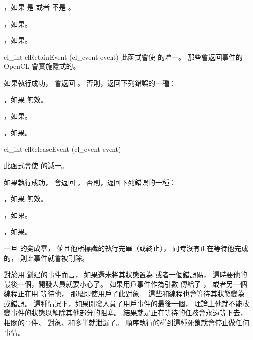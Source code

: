 \item {}，如果  是 
或者  不是 。

\item {}，如果\scdevfailres。

\item {}，如果\schostfailres。
\stopigBase


\startCLFUNC
cl_int clRetainEvent (cl_event event)
\stopCLFUNC
此函式會使  的增一。
那些會返回事件的 OpenCL 會實施隱式的。

如果執行成功，  會返回 。
否則，返回下列錯誤的一種：
\startigBase
\item {}，如果  無效。

\item {}，如果\scdevfailres。

\item {}，如果\schostfailres。
\stopigBase


\startCLFUNC
cl_int clReleaseEvent (cl_event event)
\stopCLFUNC

此函式會使  的減一。

如果執行成功，  會返回 。
否則，返回下列錯誤的一種：
\startigBase
\item {}，如果  無效。

\item {}，如果\scdevfailres。

\item {}，如果\schostfailres。
\stopigBase

一旦  的變成零，
並且他所標識的執行完畢（或終止），
同時沒有正在等待他完成的，
則此事件就會被刪除。

\startnotepar
對於用  創建的事件而言，
如果還未將其狀態置為  或者一個錯誤碼，
這時要他的最後一個，開發人員就要小心了。
如果用戶事件作為引數  傳給了 ，
或者另一個線程正在用  等待他，
那麼即使用戶了此對象，
這些和線程也會等待其狀態變為  或錯誤。
這種情況下，如果開發人員了用戶事件的最後一個，
理論上他就不能改變事件的狀態以解除其他部分的阻塞。
結果就是正在等待的任務會永遠等下去，
相關的事件、  對象、和多半就泄漏了。
順序執行的碰到這種死鎖就會停止做任何事情。
\stopnotepar
